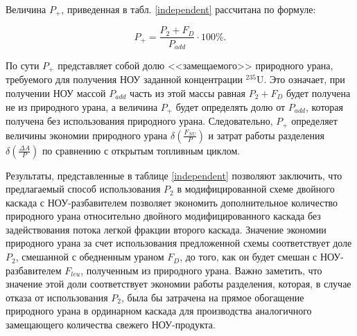 Величина $P_{+}$, приведенная в табл. \ref{independent} рассчитана по формуле:

\begin{equation} \label{P_plus} 
    P_{+} = \frac{P_2 + F_D}{P_{add}} \cdot 100\%.
\end{equation}

По сути $P_{+}$ представляет собой долю <<замещаемого>> природного урана, требуемого для получения НОУ заданной концентрации $^{235}$U. Это означает, при получении НОУ массой $P_{add}$ часть из этой массы равная ${P_2} + {F_D}$ будет получена не из природного урана, а величина $P_{+}$ будет определять долю от $P_{add}$, которая получена без использования природного урана. Следовательно, $P_{+}$ определяет величины экономии природного урана $\delta(\frac{F_{NU}}{P})$ и затрат работы разделения $\delta(\frac{\Delta A}{P})$ по сравнению с открытым топливным циклом.

Результаты, представленные в таблице \ref{independent} позволяют заключить, что предлагаемый способ использования $P_2$ в модифицированной схеме двойного каскада с НОУ-разбавителем позволяет экономить дополнительное количество природного урана относительно двойного модифицированного каскада без задействования потока легкой фракции второго каскада. Значение экономии природного урана за счет использования предложенной схемы соответствует доле $P_2$, смешанной с обедненным ураном $F_D$, до того, как он будет смешан с НОУ-разбавителем $F_{leu}$, полученным из природного урана. Важно заметить, что значение этой доли соответствует экономии работы разделения, которая, в случае отказа от использования $P_2$, была бы затрачена на прямое обогащение природного урана в ординарном каскада для производства аналогичного замещающего количества свежего НОУ-продукта.

